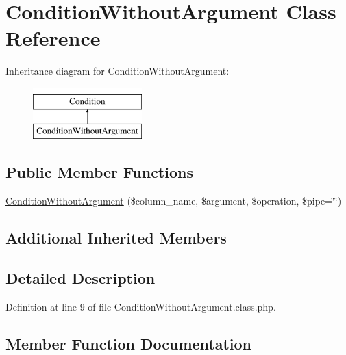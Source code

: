 \hypertarget{classConditionWithoutArgument}{}\section{Condition\+Without\+Argument Class Reference}
\label{classConditionWithoutArgument}
Inheritance diagram for Condition\+Without\+Argument\+:\begin{figure}[H]
\begin{center}
\leavevmode
\includegraphics[height=2.000000cm]{classConditionWithoutArgument}
\end{center}
\end{figure}
\subsection*{Public Member Functions}
\begin{DoxyCompactItemize}
\item 
\hyperlink{classConditionWithoutArgument_a42d42e70c74111b4980e2916b64c95e7}{Condition\+Without\+Argument} (\$column\+\_\+name, \$argument, \$operation, \$pipe=\char`\"{}\char`\"{})
\end{DoxyCompactItemize}
\subsection*{Additional Inherited Members}


\subsection{Detailed Description}


Definition at line 9 of file Condition\+Without\+Argument.\+class.\+php.



\subsection{Member Function Documentation}
\mbox{\label{classConditionWithoutArgument_a42d42e70c74111b4980e2916b64c95e7}} 

